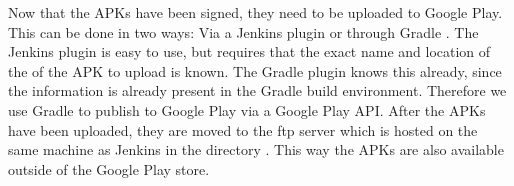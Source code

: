 Now that the APKs have been signed, they need to be uploaded to Google Play. This can be done in two ways: Via a Jenkins plugin \parencite{jenkins-play-plugin} or through Gradle \parencite{gradle-play-plugin}. The Jenkins plugin is easy to use, but requires that the exact name and location of the of the APK to upload is known. The Gradle plugin knows this already, since the information is already present in the Gradle build environment. Therefore we use Gradle to publish to Google Play via a Google Play API\@. After the APKs have been uploaded, they are moved to the ftp server which is hosted on the same machine as Jenkins in the directory . This way the APKs are also available outside of the Google Play store.